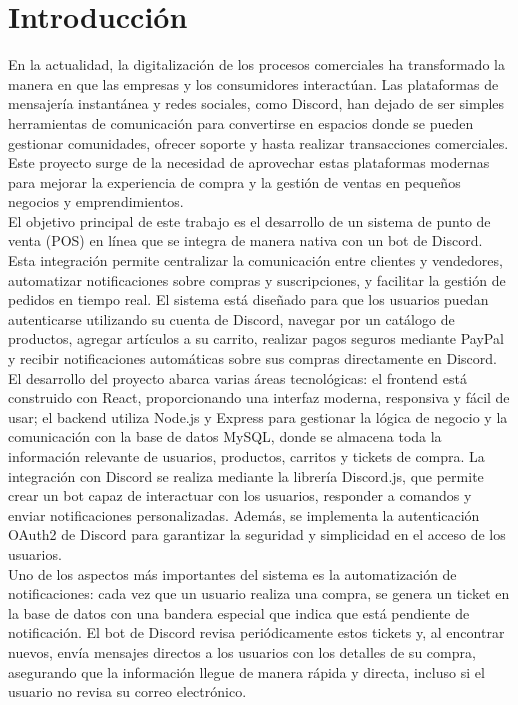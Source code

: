 \documentclass[a4paper,12pt]{article}
\begin{document}
\tableofcontents
\newpage
\renewcommand\thesection{\arabic{section}}%

\section{Introducción}

En la actualidad, la digitalización de los procesos comerciales ha transformado la manera en que las empresas y los consumidores interactúan. Las plataformas de mensajería instantánea y redes sociales, como Discord, han dejado de ser simples herramientas de comunicación para convertirse en espacios donde se pueden gestionar comunidades, ofrecer soporte y hasta realizar transacciones comerciales. Este proyecto surge de la necesidad de aprovechar estas plataformas modernas para mejorar la experiencia de compra y la gestión de ventas en pequeños negocios y emprendimientos.\\

El objetivo principal de este trabajo es el desarrollo de un sistema de punto de venta (POS) en línea que se integra de manera nativa con un bot de Discord. Esta integración permite centralizar la comunicación entre clientes y vendedores, automatizar notificaciones sobre compras y suscripciones, y facilitar la gestión de pedidos en tiempo real. El sistema está diseñado para que los usuarios puedan autenticarse utilizando su cuenta de Discord, navegar por un catálogo de productos, agregar artículos a su carrito, realizar pagos seguros mediante PayPal y recibir notificaciones automáticas sobre sus compras directamente en Discord.\\

El desarrollo del proyecto abarca varias áreas tecnológicas: el frontend está construido con React, proporcionando una interfaz moderna, responsiva y fácil de usar; el backend utiliza Node.js y Express para gestionar la lógica de negocio y la comunicación con la base de datos MySQL, donde se almacena toda la información relevante de usuarios, productos, carritos y tickets de compra. La integración con Discord se realiza mediante la librería Discord.js, que permite crear un bot capaz de interactuar con los usuarios, responder a comandos y enviar notificaciones personalizadas. Además, se implementa la autenticación OAuth2 de Discord para garantizar la seguridad y simplicidad en el acceso de los usuarios.\\

Uno de los aspectos más importantes del sistema es la automatización de notificaciones: cada vez que un usuario realiza una compra, se genera un ticket en la base de datos con una bandera especial que indica que está pendiente de notificación. El bot de Discord revisa periódicamente estos tickets y, al encontrar nuevos, envía mensajes directos a los usuarios con los detalles de su compra, asegurando que la información llegue de manera rápida y directa, incluso si el usuario no revisa su correo electrónico.\\
\end{document}
